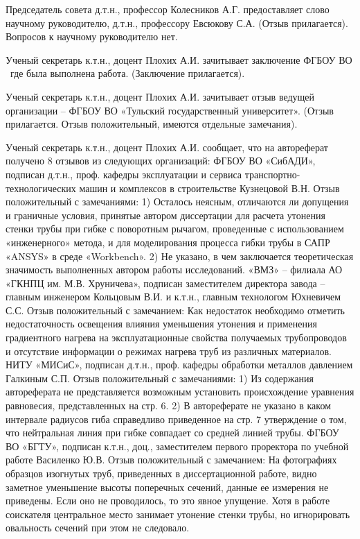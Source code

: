 Председатель совета д.т.н., профессор Колесников А.Г. предоставляет слово научному руководителю, д.т.н., профессору Евсюкову С.А. (Отзыв прилагается).
Вопросов к научному руководителю нет.

Ученый секретарь к.т.н., доцент Плохих А.И. зачитывает заключение ФГБОУ ВО \thesisOrganizationShort\, где была выполнена работа. (Заключение прилагается).

Ученый секретарь к.т.н., доцент Плохих А.И. зачитывает отзыв ведущей организации – ФГБОУ ВО «Тульский государственный университет». (Отзыв прилагается. Отзыв положительный, имеются отдельные замечания).

Ученый секретарь к.т.н., доцент Плохих А.И. сообщает, что на автореферат получено 8 отзывов из следующих организаций:
ФГБОУ ВО «СибАДИ», подписан д.т.н., проф. кафедры эксплуатации и сервиса транспортно-технологических машин и комплексов в строительстве Кузнецовой В.Н. Отзыв положительный с замечаниями:
1) Осталось неясным, отличаются ли допущения и граничные условия, принятые автором диссертации для расчета утонения стенки трубы при гибке с поворотным рычагом, проведенные с использованием «инженерного» метода, и для моделирования процесса гибки трубы в САПР «ANSYS» в среде «Workbench».
2) Не указано, в чем заключается теоретическая значимость выполненных автором работы исследований.
«ВМЗ» – филиала АО «ГКНПЦ им. М.В. Хруничева», подписан заместителем директора завода – главным инженером Кольцовым В.И. и к.т.н., главным технологом Юхневичем С.С. Отзыв положительный с замечанием:
Как недостаток необходимо отметить недостаточность освещения влияния уменьшения утонения и применения градиентного нагрева на эксплуатационные свойства получаемых трубопроводов и отсутствие информации о режимах нагрева труб из различных материалов.
НИТУ «МИСиС», подписан д.т.н., проф. кафедры обработки металлов давлением Галкиным С.П. Отзыв положительный с замечаниями:
1) Из содержания автореферата не представляется возможным установить происхождение уравнения равновесия, представленных на стр. 6.
2) В автореферате не указано в каком интервале радиусов гиба справедливо приведенное на стр. 7 утверждение о том, что нейтральная линия при гибке совпадает со средней линией трубы.
ФГБОУ ВО «БГТУ», подписан к.т.н., доц., заместителем первого проректора по учебной работе Василенко Ю.В. Отзыв положительный с замечанием:
На фотографиях образцов изогнутых труб, приведенных в диссертационной работе, видно заметное уменьшение высоты поперечных сечений, данные ее измерения не приведены. Если оно не проводилось, то это явное упущение. Хотя в работе соискателя центральное место занимает утонение стенки трубы, но игнорировать овальность сечений при этом не следовало.
